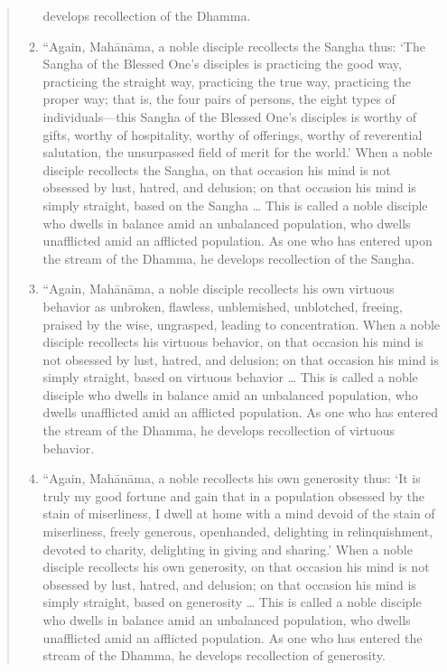 \begin{quotation}
\begin{enumerate}
  develops recollection of the Dhamma.
\item
  “Again, Mahānāma, a noble disciple recollects the Sangha thus: ‘The
  Sangha of the Blessed One’s disciples is practicing the good way,
  practicing the straight way, practicing the true way, practicing the
  proper way; that is, the four pairs of persons, the eight types of
  individuals—this Sangha of the Blessed One’s disciples is worthy of
  gifts, worthy of hospitality, worthy of offerings, worthy of
  reverential salutation, the unsurpassed field of merit for the world.’
  When a noble disciple recollects the Sangha, on that occasion his mind
  is not obsessed by lust, hatred, and delusion; on that occasion his
  mind is simply straight, based on the Sangha \ldots{} This is called a
  noble disciple who dwells in balance amid an unbalanced population,
  who dwells unafflicted amid an afflicted population. As one who has
  entered upon the stream of the Dhamma, he develops recollection of the
  Sangha.
\item
  “Again, Mahānāma, a noble disciple recollects his own virtuous
  behavior as unbroken, flawless, unblemished, unblotched, freeing,
  praised by the wise, ungrasped, leading to concentration. When a noble
  disciple recollects his virtuous behavior, on that occasion his mind
  is not obsessed by lust, hatred, and delusion; on that occasion his
  mind is simply straight, based on virtuous behavior \ldots{} This is called
  a noble disciple who dwells in balance amid an unbalanced population,
  who dwells unafflicted amid an afflicted population. As one who has
  entered the stream of the Dhamma, he develops recollection of virtuous
  behavior.
\item
  “Again, Mahānāma, a noble recollects his own generosity thus: ‘It is
  truly my good fortune and gain that in a population obsessed by the
  stain of miserliness, I dwell at home with a mind devoid of the stain
  of miserliness, freely generous, openhanded, delighting in
  relinquishment, devoted to charity, delighting in giving and sharing.’
  When a noble disciple recollects his own generosity, on that occasion
  his mind is not obsessed by lust, hatred, and delusion; on that
  occasion his mind is simply straight, based on generosity \ldots{} This is
  called a noble disciple who dwells in balance amid an unbalanced
  population, who dwells unafflicted amid an afflicted population. As
  one who has entered the stream of the Dhamma, he develops recollection
  of generosity.
\end{enumerate}


\end{quotation}
